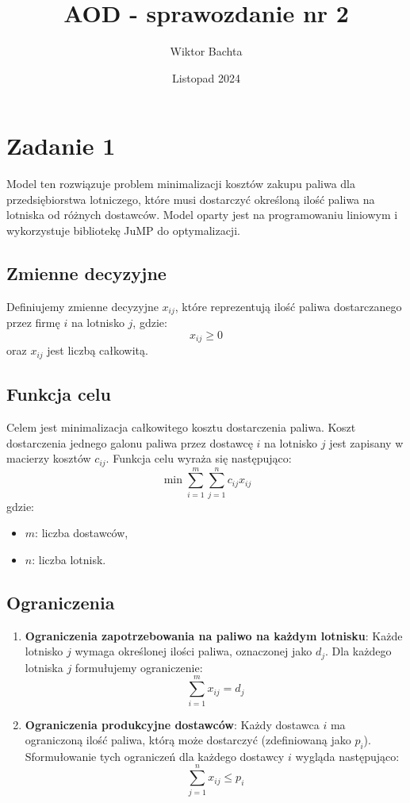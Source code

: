 \documentclass[12pt, letterpaper]{article}
\title{AOD - sprawozdanie nr 2}
\author{Wiktor Bachta}
\date{Listopad 2024}
\begin{document}
\maketitle

\section{Zadanie 1}

Model ten rozwiązuje problem minimalizacji kosztów zakupu paliwa dla
przedsiębiorstwa lotniczego, które musi dostarczyć określoną ilość paliwa na
lotniska od różnych dostawców. Model oparty jest na programowaniu
liniowym i wykorzystuje bibliotekę JuMP do optymalizacji.

\subsection*{Zmienne decyzyjne}
Definiujemy zmienne decyzyjne \( x_{ij} \), które reprezentują ilość paliwa
dostarczanego przez firmę \( i \) na lotnisko \( j \), gdzie:
\[
  x_{ij} \geq 0
\]
oraz \( x_{ij} \) jest liczbą całkowitą.

\subsection*{Funkcja celu}
Celem jest minimalizacja całkowitego kosztu dostarczenia paliwa. Koszt
dostarczenia jednego galonu paliwa przez dostawcę \( i \) na lotnisko \( j \)
jest zapisany w macierzy kosztów \( c_{ij} \). Funkcja celu wyraża się
następująco:
\[
  \min \sum_{i=1}^m \sum_{j=1}^n c_{ij} x_{ij}
\]
gdzie:
\begin{itemize}
  \item $m$: liczba dostawców,
  \item $n$: liczba lotnisk.
\end{itemize}

\subsection*{Ograniczenia}
\begin{enumerate}
  \item \textbf{Ograniczenia zapotrzebowania na paliwo na każdym lotnisku}:
        Każde lotnisko \( j \) wymaga określonej ilości paliwa, oznaczonej jako
        \( d_j
        \). Dla każdego lotniska \( j \) formułujemy ograniczenie:
        \[
          \sum_{i=1}^m x_{ij} = d_j
        \]

  \item \textbf{Ograniczenia produkcyjne dostawców}: Każdy dostawca \( i \)
        ma ograniczoną ilość paliwa, którą może dostarczyć (zdefiniowaną jako
        \( p_i
        \)). Sformułowanie tych ograniczeń dla każdego dostawcy \( i \) wygląda
        następująco:
        \[
          \sum_{j=1}^n x_{ij} \leq p_i
        \]
\end{enumerate}
\end{document}
